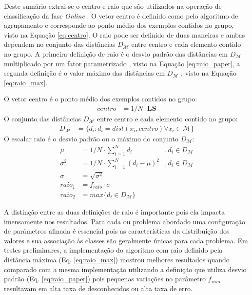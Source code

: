 Deste sumário extrai-se o centro e raio que são utilizados na operação de
classificação da fase \emph{Online} \cite{Faria2016minas}.
O vetor centro é definido como pelo algoritmo de agrupamento e corresponde ao
ponto médio dos exemplos contidos no grupo, visto na Equação \ref{eq:centro}.
O raio pode ser definido de duas maneiras e ambas dependem no conjunto das
distâncias $D_\mathcal{M}$ entre centro e cada elemento contido no grupo.
A primeira definição de raio é o desvio padrão das distâncias em $D_\mathcal{M}$
multiplicado por um fator parametrizado \cite{Faria2016minas}, visto na Equação
\ref{eq:raio_paper}, a segunda definição é o valor máximo das distâncias em
$D_\mathcal{M}$ \cite{Faria2013source}, visto na Equação \ref{eq:raio_max}.

\begin{definition}
  O vetor centro é o ponto médio dos exemplos contidos no grupo:
  \begin{align}
    centro    &= 1/N \cdot \mathbf{LS} \label{eq:centro}
  \end{align}
  O conjunto das distâncias $D_\mathcal{M}$ entre centro e cada elemento contido no grupo:
  \begin{align}
    D_\mathcal{M}  &= \{ d_i : d_i = dist(x_i, centro) \forall x_i \in \mathcal{M} \} \nonumber
  \end{align}
  O escalar raio é o desvio padrão ou o máximo do conjunto $D_\mathcal{M}$:
  \begin{align}
    \mu       &= 1/N \cdot \sum_{i=1}^{N} d_i             &, d_i \in D_\mathcal{M} \nonumber \\
    \sigma^2  &= 1/N \cdot \sum_{i=1}^{N} (d_i - \mu) ^2  &, d_i \in D_\mathcal{M} \nonumber \\
    \sigma    &= \sqrt{ \sigma^2 }                        & \nonumber \\
    raio_1    &= f_{raio} \cdot \sigma                    & \label{eq:raio_paper}\\
    raio_2    &= max\{ d_i \in D_\mathcal{M} \}           & \label{eq:raio_max}
  \end{align}
\end{definition}


A distinção entre as duas definições de raio é importante pois ela impacta
imensamente nos resultados.
Para cada \dataset ou problema abordado uma configuração de parâmetros afinada
é essencial pois as características da distribuição dos valores e sua associação
às classes são geralmente únicas para cada problema.
Em testes preliminares, a implementação do algoritmo \minas com raio definido
pela distância máxima (Eq. \ref{eq:raio_max}) mostrou melhores resultados quando
comparado com a mesma implementação utilizando a definição que utiliza desvio
padrão (Eq. \ref{eq:raio_paper}) pois pequenas variações no parâmetro $f_{raio}$
resultavam em alta taxa de desconhecidos ou alta taxa de erro.

